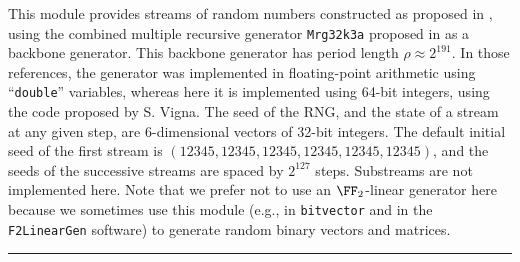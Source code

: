 
This module provides streams of random numbers constructed as proposed in \cite{rLEC02a},
using the combined multiple recursive generator {\tt Mrg32k3a} proposed in \cite{rLEC99b}
as a backbone generator.  This backbone generator has period length $\rho\approx 2^{191}$.
In those references, the generator was implemented in floating-point arithmetic
using ``\texttt{double}'' variables, whereas here it is implemented using 64-bit integers,
using the code proposed by S. Vigna.
The seed of the RNG, and the state of a stream at any given step,
are 6-dimensional vectors of 32-bit integers.
The default initial seed of the first stream is
$(12345, 12345, 12345, 12345, 12345, 12345)$,
and the seeds of the successive streams are spaced by $2^{127}$ steps.
Substreams are not implemented here.
Note that we prefer not to use an $\FF_2$-linear generator here because 
we sometimes use this module (e.g., in \texttt{bitvector} and in the 
\texttt{F2LinearGen} software) to generate random binary vectors and matrices. 


\bigskip\hrule

